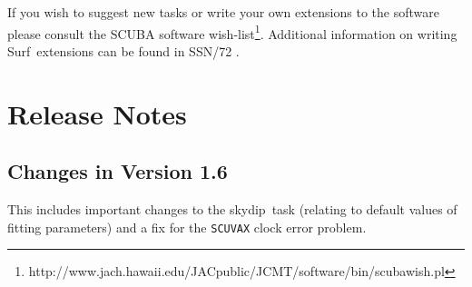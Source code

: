 \documentclass[twoside,11pt]{article}
\newcommand{\scusoft}          {{\sc Surf}}
\newcommand{\task}[1]{{\sf #1}}
\newcommand{\skydip}{\htmlref{\task{skydip}}{SKYDIP}}
\newcommand{\htmladdnormallinkfoot}[2]{#1\footnote{#2}}
\newcommand{\htmlref}[2]{#1}
\newcommand{\xlabel}[1]{}
\renewcommand{\_}{\texttt{\symbol{95}}}
\begin{document}
If you wish to suggest new tasks or write your own extensions to the 
software please consult the \htmladdnormallinkfoot{SCUBA software
wish-list}{http://www.jach.hawaii.edu/JACpublic/JCMT/software/bin/scuba\_wish.pl}.
Additional information on writing \scusoft\ extensions can be found
in SSN/72 \cite{ssn72}.


\section{\xlabel{relnotes}Release Notes\label{relnotes}}

\subsection{Changes in Version 1.6}

This includes important changes to the \skydip\ task (relating
to default values of fitting parameters) and a fix for the \texttt{SCUVAX}
clock error problem.
\end{document}
